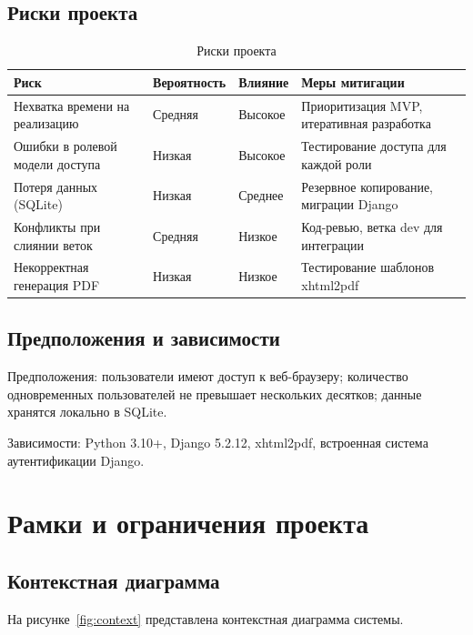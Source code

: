 \documentclass[14pt,a4paper]{extarticle}
\begin{document}
\subsection{Риски проекта}

\begin{table}[H]
\centering
\caption{Риски проекта}
\label{tab:risks}
\small
\begin{tabular}{|L{3.5cm}|C{2cm}|C{2cm}|L{5cm}|}
\hline
\textbf{Риск} & \textbf{Вероят\-ность} & \textbf{Влияние} & \textbf{Меры митигации} \\
\hline
Нехватка времени на реализацию & Средняя & Высокое & Приоритизация MVP, итеративная разработка \\
\hline
Ошибки в ролевой модели доступа & Низкая & Высокое & Тестирование доступа для каждой роли \\
\hline
Потеря данных (SQLite) & Низкая & Среднее & Резервное копирование, миграции Django \\
\hline
Конфликты при слиянии веток & Средняя & Низкое & Код-ревью, ветка dev для интеграции \\
\hline
Некорректная генерация PDF & Низкая & Низкое & Тестирование шаблонов xhtml2pdf \\
\hline
\end{tabular}
\end{table}

\subsection{Предположения и зависимости}

Предположения: пользователи имеют доступ к веб-браузеру; количество одновременных пользователей не превышает нескольких десятков; данные хранятся локально в SQLite.

Зависимости: Python 3.10+, Django 5.2.12, xhtml2pdf, встроенная система аутентификации Django.

\newpage

\section{Рамки и ограничения проекта}

\subsection{Контекстная диаграмма}

На рисунке~\ref{fig:context} представлена контекстная диаграмма системы.
\end{document}
